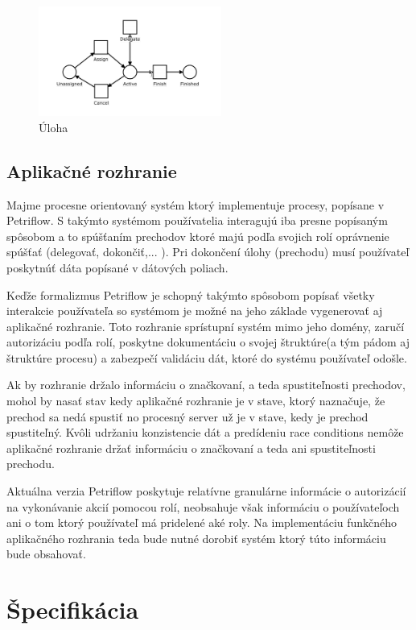 \begin{figure}[!htbp]
	\centering
	\includegraphics[width=6cm]{img/task_transition.png}
	\caption{Úloha}
	\label{task}
\end{figure}

\subsection{Aplikačné rozhranie}
Majme procesne orientovaný systém ktorý implementuje procesy, popísane v Petriflow. S takýmto systémom používatelia interagujú iba presne popísaným spôsobom a to spúšťaním prechodov ktoré majú podľa svojich rolí oprávnenie spúšťať (delegovať, dokončiť,... ). Pri dokončení úlohy (prechodu) musí používateľ poskytnúť dáta popísané v dátových poliach.

Keďže formalizmus Petriflow je schopný takýmto spôsobom popísať všetky interakcie používateľa so systémom je možné na jeho základe vygenerovať aj aplikačné rozhranie. Toto rozhranie sprístupní systém mimo jeho domény, zaručí autorizáciu podľa rolí, poskytne dokumentáciu o svojej štruktúre(a tým pádom aj štruktúre procesu) a zabezpečí validáciu dát, ktoré do systému používateľ odošle.

Ak by rozhranie držalo informáciu o značkovaní, a teda spustiteľnosti prechodov, mohol by nasať stav kedy aplikačné rozhranie je v stave, ktorý naznačuje, že prechod sa nedá spustiť no procesný server už je v stave, kedy je prechod spustiteľný. Kvôli udržaniu konzistencie dát a predídeniu race conditions nemôže aplikačné rozhranie držať informáciu o značkovaní a teda ani spustiteľnosti prechodu.

Aktuálna verzia Petriflow poskytuje relatívne granulárne informácie o autorizácií na vykonávanie akcií pomocou rolí, neobsahuje však informáciu o používateľoch ani o tom ktorý používateľ má pridelené aké roly. Na implementáciu funkčného aplikačného rozhrania teda bude nutné dorobiť systém ktorý túto informáciu bude obsahovať.


\section{Špecifikácia}


